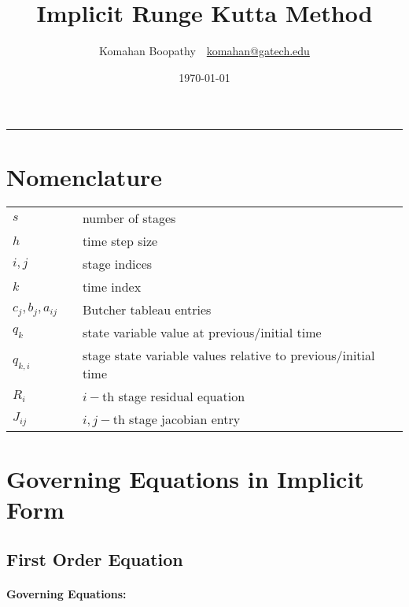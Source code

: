 \documentclass[pdftex,11pt,letter]{article}
\title{\textbf{Implicit Runge Kutta Method}}
\author{Komahan Boopathy~~\url{komahan@gatech.edu}} \date{\today}
\begin{document}
\maketitle
\vspace{-0.25in}
\rule{\linewidth}{2pt}



\section*{Nomenclature}
\begin{minipage}[b]{0.5\linewidth}\centering
\begin{tabular}{@{}lcl@{}}
$s$   && number of stages\\
$h$   && time step size \\
$i,j$ && stage indices \\
$k$   && time index \\
$c_j,b_j,a_{ij}$ && Butcher tableau entries \\
$q_k$ && state variable value at previous/initial time \\
$q_{k,i}$ && stage state variable values relative to previous/initial time \\
$R_i$  && $i-$th stage residual equation \\
$J_{ij}$  && $i,j-$th stage jacobian entry \\
\end{tabular}
\end{minipage}


\section{Governing Equations in Implicit Form}

\subsection{First Order Equation}

\paragraph{Governing Equations:}
\end{document}
